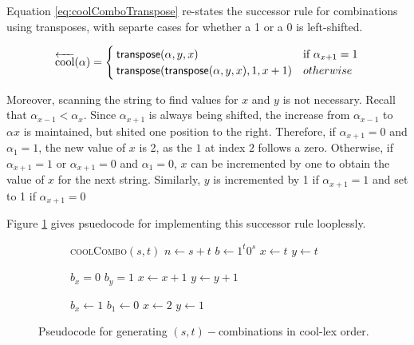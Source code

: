 Equation \ref{eq:coolComboTranspose} re-states the successor rule for combinations using transposes, with separte cases for whether a 1 or a 0 is left-shifted.

\begin{equation}\label{eq:coolComboTranspose}
    \overleftarrow{\text{cool}}(\alpha) = \begin{cases}
	\mathsf{transpose(} \alpha, y, x \mathsf{)} & \text{if $\alpha_{x+1}=1$}\\
	\mathsf{transpose(} \mathsf{transpose(} \alpha, y, x \mathsf{)}, 1, x+1 \mathsf{)} & otherwise\\
\end{cases}
\end{equation}

Moreover, scanning the string to find values for $x$ and $y$ is not necessary.  Recall that $\alpha_{x-1} < \alpha_{x}$.  Since $\alpha_{x+1}$ is always being shifted, the increase from $\alpha_{x-1}$ to $\alpha{x}$ is maintained, but shited one position to the right.  Therefore, if $\alpha_{x+1}=0$ and $\alpha_{1}=1$, the new value of $x$ is 2, as the $1$ at index $2$ follows a zero.  Otherwise, if $\alpha_{x+1}=1$ or $\alpha_{x+1}=0$ and $\alpha_{1}=0$, $x$ can be incremented by one to obtain the value of $x$ for the next string.  Similarly, $y$ is incremented by 1 if $\alpha_{x+1}=1$ and set to 1 if $\alpha_{x+1}=0$

Figure \ref{fig:coolComboCode} gives psuedocode for implementing this successor rule looplessly.

\begin{figure}[H]
    \centering
    \begin{subfigure}[t]{0.275\textwidth}
        \centering
        \begin{algorithm}[H]
        \begin{algorithmic}
        \State \textsc{coolCombo}$(s,t)$
        \State $n \gets s+t$
        \State $b \gets 1^t 0^s$
        \State $x \gets t$
        \State $y \gets t$
        \State {}
        
            \State $b_x=0$
            \State $b_y=1$
            \State $x \gets x+1$
            \State $y \gets y+1$
            
                \State $b_x \gets 1$ %
                \State $b_1 \gets 0$ %
                    \State $x \gets 2$
                \EndIf
                \State $y \gets 1$
            \EndIf
        \EndWhile
        \end{algorithmic}
        \end{algorithm}

    \end{subfigure}
    \caption{Pseudocode for generating $(s,t)-$combinations in cool-lex order.}
    \label{fig:coolComboCode}
\end{figure}

